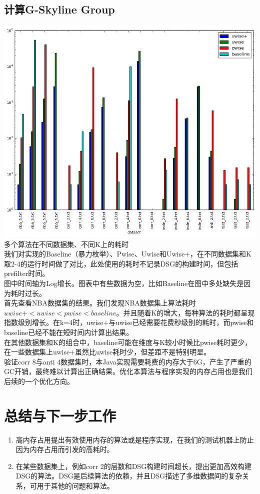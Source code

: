 \documentclass{article}
\begin{document}
\begin{CJK}{UTF8}{gbsn}
\subsection{计算G-Skyline Group}

\includegraphics[scale=0.4]{pics/eval_4_algo_on_multi_dataset.png}
\\多个算法在不同数据集、不同K上的耗时\\
我们对实现的Baseline（暴力枚举）、Pwise、Uwise和Uwise+，在不同数据集和K取2-4的运行时间做了对比，此处使用的耗时不记录DSG的构建时间，但包括prefilter时间。\\
图中时间轴为Log增长。图表中有些数据为空，比如Baseline在图中多处缺失是因为耗时过长。\\
首先查看NBA数据集的结果。我们发现NBA数据集上算法耗时$uwise+ < uwise < pwise < baseline$。并且随着K的增大，每种算法的耗时都呈现指数级别增长。在k=4时，uwise+与uwise已经需要花费秒级别的耗时，而pwise和baseline已经不能在短时间内计算出结果。\\
在其他数据集和K的组合中，baseline可能在维度与K较小时候比pwise耗时更少，在一些数据集上uwise+虽然比uwise耗时少，但差距不是特别明显。\\
验证corr 8与anti 4数据集时，本Java实现需要耗费的内存大于6G，产生了严重的GC开销，最终难以计算出正确结果。优化本算法与程序实现的内存占用也是我们后续的一个优化方向。

\section{总结与下一步工作}
\begin{enumerate}
	\item 高内存占用提出有效使用内存的算法或是程序实现，在我们的测试机器上防止因为内存占用而引发的高耗时。
	\item 在某些数据集上，例如corr 2的层数和DSG构建时间超长，提出更加高效构建DSG的算法。DSG是后续算法的依赖，并且DSG描述了多维数据间的复杂关系，可用于其他的问题和算法。
\end{enumerate}


\end{CJK}
\end{document}
